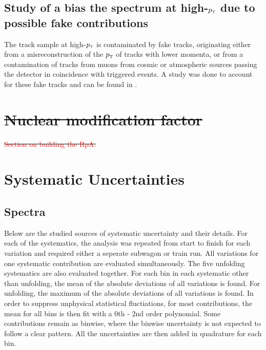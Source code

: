 \documentclass[ALICE]{ALICE_analysis_notes}
\newcommand{\pT}{$p_{\mbox{\tiny T}}$\xspace}
\providecommand{\DIFdeltex}[1]{{\protect\color{red}\sout{#1}}}                      %
\providecommand{\DIFdelbegin}{} %
\providecommand{\DIFdelend}{} %
\providecommand{\DIFdel}[1]{\texorpdfstring{\DIFdeltex{#1}}{}} %
\newcommand{\DIFscaledelfig}{0.5}
\newlength{\DIFdelgraphicswidth} %
\newlength{\DIFdelgraphicsheight} %
\newcommand{\DIFdelincludegraphics}[2][]{%
\sbox{\DIFdelgraphicsbox}{\DIFOincludegraphics[#1]{#2}}%
\settoboxwidth{\DIFdelgraphicswidth}{\DIFdelgraphicsbox} %
\settoboxtotalheight{\DIFdelgraphicsheight}{\DIFdelgraphicsbox} %
\scalebox{\DIFscaledelfig}{%
\parbox[b]{\DIFdelgraphicswidth}{\usebox{\DIFdelgraphicsbox}\\[-\baselineskip] \rule{\DIFdelgraphicswidth}{0em}}\llap{\resizebox{\DIFdelgraphicswidth}{\DIFdelgraphicsheight}{%
\setlength{\unitlength}{\DIFdelgraphicswidth}%
\begin{picture}(1,1)%
\thicklines\linethickness{2pt} %
{\color[rgb]{1,0,0}\put(0,0){\framebox(1,1){}}}%
{\color[rgb]{1,0,0}\put(0,0){\line( 1,1){1}}}%
{\color[rgb]{1,0,0}\put(0,1){\line(1,-1){1}}}%
\end{picture}%
}\hspace*{3pt}}} %
} %
\DeclareRobustCommand{\DIFdelbegin}{\DIFOdelbegin \let\includegraphics\DIFdelincludegraphics} %
\DeclareRobustCommand{\DIFdelend}{\DIFOaddend \let\includegraphics\DIFOincludegraphics} %
\begin{document}
\subsection{Study of a bias the spectrum at high-\texorpdfstring{\pT}{pT} due to possible fake contributions}
\label{sec:biasStudy}

The track sample at high-\pT is contaminated by fake tracks, originating either from a misreconstruction of the \pT of tracks with lower momenta, or from a contamination of tracks from muons from cosmic or atmospheric sources passing the detector in coincidence with triggered events. A study was done to account for these fake tracks and can be found in \cite{anaNoteMFasel}.\clearpage{}
\clearpage{}\DIFdelbegin \section{\DIFdel{Nuclear modification factor}}
\addtocounter{section}{-1}%

\DIFdel{\textcolor{red}{Section on building the RpA.}}%
\DIFdelend \section{Systematic Uncertainties}
\label{chap:Systematics}

\subsection{Spectra}
\label{sec:SystematicsSpectra}

Below are the studied sources of systematic uncertainty and their details. For each of the systematics, the analysis was repeated from start to finish for each variation and required either a seperate subwagon or train run. All variations for one systematic contribution are evaluated simultaneously. The five unfolding systematics are also evaluated together. For each bin in each systematic other than unfolding, the mean of the absolute deviations of all variations is found. For unfolding, the maximum of the absolute deviations of all variations is found. In order to suppress unphysical statistical fluctiations, for most contributions, the mean for all bins is then fit with a 0th - 2nd order polynomial. Some contributions remain as binwise, where the binwise uncertainty is not expected to follow a clear pattern. All the uncertainties are then added in quadrature for each bin.
\end{document}
